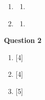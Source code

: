 \begin{enumerate}[label=(\roman*)]
        \begin{multicols}{2}
        \begin{enumerate}[label=(\alph*)]
            \item 
        \end{enumerate}
        \end{multicols}

    \item 

        \begin{multicols}{2}
        \begin{enumerate}[label=(\alph*)]
            \item 
        \end{enumerate}
        \end{multicols}

    \item 

        \begin{multicols}{2}
        \begin{enumerate}[label=(\alph*)]
            \item 
        \end{enumerate}
        \end{multicols}

\end{enumerate}

\par
\noindent
\textbf{Question 2}\\
\begin{enumerate}[label=(\roman*)]

    \item \hfill [4]

    \item \hfill [4]

    \item \hfill [5]

\end{enumerate}

